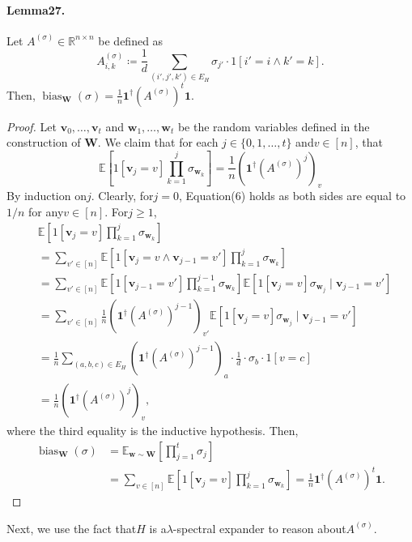 \documentclass[10pt,a4paper]{article}
\DeclareMathOperator{\bias}{bias}
\begin{document}
\paragraph{Lemma27.} Let $A^{(\sigma)}\in\mathbb R^{n\times n}$ be defined as
\[A^{(\sigma)}_{i,k}\coloneqq\frac1d\sum_{(i',j',k')\in E_H}\sigma_{j'}\cdot1[i'=i\land k'=k].\]
Then, $\bias_{\mathbf W}(\sigma)=\frac1n\mathbf1^{\dagger}(A^{(\sigma)})^t\mathbf1$.
\begin{proof}
Let $\mathbf v_0,\ldots,\mathbf v_t$ and $\mathbf w_1,\ldots,\mathbf w_t$ be the random variables defined in the construction of $\mathbf W$. We claim that for each $j\in\{0,1,\ldots,t\}$ and$v\in[n]$, that
\[\mathbb E\left[1[\mathbf v_j=v]\prod_{k=1}^j\sigma_{\mathbf w_k}\right]=\frac1n\left(\mathbf1^{\dagger}(A^{(\sigma)})^j\right)_v\tag{6}\]
By induction on$j$. Clearly, for$j=0$, Equation(6) holds as both sides are equal to$1/n$ for any$v\in[n]$. For$j\geq1$,
\begin{align*}
&\mathbb E\left[1[\mathbf v_j=v]\prod_{k=1}^j\sigma_{\mathbf w_k}\right]\\
&=\sum_{v'\in[n]}\mathbb E\left[1[\mathbf v_j=v\land\mathbf v_{j-1}=v']\prod_{k=1}^j\sigma_{\mathbf w_k}\right]\\
&=\sum_{v'\in[n]}\mathbb E\left[1[\mathbf v_{j-1}=v']\prod_{k=1}^{j-1}\sigma_{\mathbf w_k}\right]\mathbb E[1[\mathbf v_j=v]\sigma_{\mathbf w_j}\mid\mathbf v_{j-1}=v']\\
&=\sum_{v'\in[n]}\frac1n\left(\mathbf1^{\dagger}(A^{(\sigma)})^{j-1}\right)_{v'}\mathbb E[1[\mathbf v_j=v]\sigma_{\mathbf w_j}\mid\mathbf v_{j-1}=v']\\
&=\frac1n\sum_{(a,b,c)\in E_H}\left(\mathbf1^{\dagger}(A^{(\sigma)})^{j-1}\right)_a\cdot\frac1d\cdot\sigma_b\cdot1[v=c]\\
&=\frac1n\left(\mathbf1^{\dagger}(A^{(\sigma)})^j\right)_v,
\end{align*}
where the third equality is the inductive hypothesis. Then,
\begin{align*}
\bias_{\mathbf W}(\sigma)&=\mathbb E_{\mathbf w\sim\mathbf W}\left[\prod_{j=1}^t\sigma_j\right]\\
&=\sum_{v\in[n]}\mathbb E\left[1[\mathbf v_j=v]\prod_{k=1}^j\sigma_{\mathbf w_k}\right]=\frac1n\mathbf1^{\dagger}(A^{(\sigma)})^t\mathbf1.
\end{align*}
\end{proof}
Next, we use the fact that$H$ is a$\lambda$-spectral expander to reason about$A^{(\sigma)}$.
\end{document}
